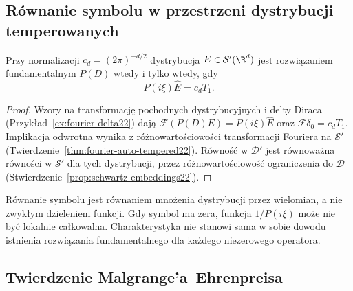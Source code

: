 \subsection{Równanie symbolu w przestrzeni dystrybucji temperowanych}

\begin{stwierdzenie}
\label{prop:dt-fundamental-symbol}
Przy normalizacji $c_d=(2\pi)^{-d/2}$ dystrybucja
$E\in\mathcal S'(\R^d)$ jest rozwiązaniem fundamentalnym
$P(D)$ wtedy i tylko wtedy, gdy
\[
 P(i\xi)\widehat E=c_d T_1.
\]
\end{stwierdzenie}
\begin{proof}
Wzory na transformację pochodnych dystrybucyjnych
i delty Diraca (Przykład~\ref{ex:fourier-delta22})
dają $\mathcal F(P(D)E)=P(i\xi)\widehat E$
oraz $\mathcal F\delta_0=c_d T_1$.
Implikacja odwrotna wynika z różnowartościowości
transformacji Fouriera na $\mathcal S'$
(Twierdzenie~\ref{thm:fourier-auto-tempered22}).
Równość w $\mathcal D'$ jest równoważna równości
w $\mathcal S'$ dla tych dystrybucji, przez
różnowartościowość ograniczenia do $\mathcal D$
(Stwierdzenie~\ref{prop:schwartz-embeddings22}).
\end{proof}

\begin{uwaga}
Równanie symbolu jest równaniem mnożenia dystrybucji
przez wielomian, a nie zwykłym dzieleniem funkcji.
Gdy symbol ma zera, funkcja $1/P(i\xi)$ może
nie być lokalnie całkowalna. Charakterystyka
nie stanowi sama w sobie dowodu istnienia
rozwiązania fundamentalnego dla każdego niezerowego
operatora.
\end{uwaga}

\subsection{Twierdzenie Malgrange'a--Ehrenpreisa}

